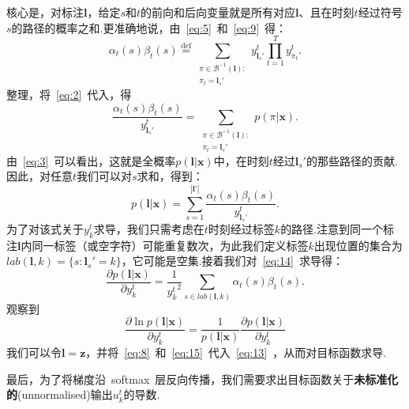 \documentclass{ctexart}
\def\cB{\mathcal{B}}
\def\vl{\mathbf{l}}
\def\vx{\mathbf{x}}
\def\vz{\mathbf{z}}
\def\defeq{\overset{\mathrm{def}}{=}}
\begin{document}
核心是，对标注$\vl$，给定$s$和$t$的前向和后向变量就是所有对应$\vl$、且在时刻$t$经过符号$s$的路径的概率之和.更准确地说，由~\eqref{eq:5}~和~\eqref{eq:9}~得：
\[
	\alpha_t(s)\beta_t(s)
	\defeq
	\sum_{
		\substack{
			\pi\in\cB^{-1}(\vl):\\
			\pi_t = \vl_s'
		}
	}
	y_{\vl_s'}^t
	\prod_{t=1}^T y_{\pi_t}^t.
\]
整理，将~\eqref{eq:2}~代入，得
\[\frac{\alpha_t(s)\beta_t(s)}{y_{\vl_s'}^t} = 
	\sum_{
		\substack{
			\pi\in\cB^{-1}(\vl):\\
			\pi_t = \vl_s'
		}
	}
	p(\pi|\vx).
\]
由~\eqref{eq:3}~可以看出，这就是全概率$p(\vl|\vx)$中，在时刻$t$经过$\vl_s'$的那些路径的贡献.因此，对任意$t$我们可以对$s$求和，得到：
\begin{equation}
	\label{eq:14}
	p(\vl|\vx) = \sum_{s=1}^{|\vl'|}\frac{\alpha_t(s)\beta_t(s)}{y_{\vl_s'}^t}.
\end{equation}
为了对该式关于$y_k^t$求导，我们只需考虑在$t$时刻经过标签$k$的路径.注意到同一个标注$\vl$内同一标签（或空字符）可能重复数次，为此我们定义标签$k$出现位置的集合为$\textit{lab}(\vl, k) = \{s : \vl_s' = k\}$，它可能是空集.接着我们对~\ref{eq:14}~求导得：
\begin{equation}
	\label{eq:15}
	\frac{\partial p(\vl|\vx)}{\partial y_k^t} = 
	\frac{1}{{y_k^t}^2}
	\sum_{s\in\textit{lab}(\vl, k)} \alpha_t(s)\beta_t(s).
\end{equation}
观察到
\[\frac{\partial\ln{p(\vl|\vx)}}{\partial y_k^t} = \frac{1}{p(\vl|\vx)}\frac{\partial p(\vl|\vx)}{\partial y_k^t}\]
我们可以令$\vl = \vz$，并将~\eqref{eq:8}~和~\eqref{eq:15}~代入~\eqref{eq:13}~，从而对目标函数求导.

最后，为了将梯度沿~softmax~层反向传播，我们需要求出目标函数关于\textbf{未标准化的}(unnormalised)输出$u_k^t$的导数.
\end{document}
